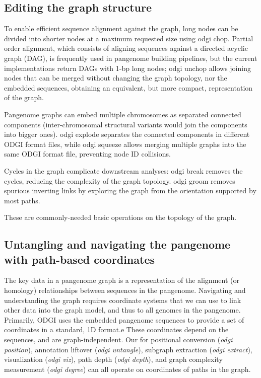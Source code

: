 \documentclass{bioinfo}
\begin{document}


\subsection{Editing the graph structure}
\label{sec:edit}



To enable efficient sequence alignment against the graph, long nodes can be divided into shorter nodes at a maximum requested size using odgi chop. Partial order alignment, which consists of aligning sequences against a directed acyclic graph (DAG), is frequently used in pangenome building pipelines, but the current implementations return DAGs with 1-bp long nodes; odgi unchop allows joining nodes that can be merged without changing the graph topology, nor the embedded sequences, obtaining an equivalent, but more compact, representation of the graph.

Pangenome graphs can embed multiple chromosomes as separated connected components (inter-chromosomal structural variants would join the components into bigger ones).
odgi explode separates the connected components in different ODGI format files, while odgi squeeze allows merging multiple graphs into the same ODGI format file, preventing node ID collisions.

Cycles in the graph complicate downstream analyses: odgi break removes the cycles, reducing the complexity of the graph topology.
odgi groom removes spurious inverting links by exploring the graph from the orientation supported by most paths.



These are commonly-needed basic operations on the topology of the graph.



\subsection{Untangling and navigating the pangenome with path-based coordinates}
\label{sec:untangle}


The key data in a pangenome graph is a representation of the alignment (or homology) relationships between sequences in the pangenome.
Navigating and understanding the graph requires coordinate systems that we can use to link other data into the graph model, and thus to all genomes in the pangenome.
Primarily, ODGI uses the embedded pangenome sequences to provide a set of coordinates in a standard, 1D format.e
These coordinates depend on the sequences, and are graph-independent.
Our for positional conversion (\textit{odgi position}), annotation liftover (\textit{odgi untangle}), subgraph extraction (\textit{odgi extract}), visualization (\textit{odgi viz}), path depth (\textit{odgi depth}), and graph complexity measurement (\textit{odgi degree}) can all operate on coordinates of paths in the graph.
\end{document}
